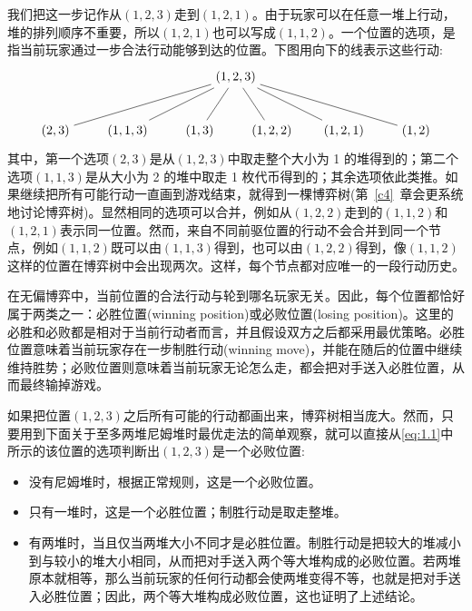 我们把这一步记作从$(1,2,3)$走到$(1,2,1)$。由于玩家可以在任意一堆上行动，堆的排列顺序不重要，所以$(1,2,1)$也可以写成$(1,1,2)$。一个位置的选项，是指当前玩家通过一步合法行动能够到达的位置。下图用向下的线表示这些行动:
\begin{equation}
\begin{tikzpicture}[level distance=1.5cm,
  level 1/.style={sibling distance=2cm},
  baseline=(current bounding box.center)]
  \node {$(1,2,3)$}
    child {node {$(2,3)$}}
    child {node {$(1,1,3)$}}
    child {node {$(1,3)$}}
    child {node {$(1,2,2)$}}
    child {node {$(1,2,1)$}}
    child {node {$(1,2)$}};
\end{tikzpicture}
\label{eq:1.1}
\end{equation}
 其中，第一个选项$(2,3)$是从$(1,2,3)$中取走整个大小为 1 的堆得到的；第二个选项$(1,1,3)$是从大小为 2 的堆中取走 1 枚代币得到的；其余选项依此类推。如果继续把所有可能行动一直画到游戏结束，就得到一棵博弈树(第~\ref{c4}~章会更系统地讨论博弈树)。显然相同的选项可以合并，例如从$(1,2,2)$走到的$(1,1,2)$和$(1,2,1)$表示同一位置。然而，来自不同前驱位置的行动不会合并到同一个节点，例如$(1,1,2)$既可以由$(1,1,3)$得到，也可以由$(1,2,2)$得到，像$(1,1,2)$这样的位置在博弈树中会出现两次。这样，每个节点都对应唯一的一段行动历史。

在无偏博弈中，当前位置的合法行动与轮到哪名玩家无关。因此，每个位置都恰好属于两类之一：必胜位置(winning position)或必败位置(losing position)。这里的必胜和必败都是相对于当前行动者而言，并且假设双方之后都采用最优策略。必胜位置意味着当前玩家存在一步制胜行动(winning move)，并能在随后的位置中继续维持胜势；必败位置则意味着当前玩家无论怎么走，都会把对手送入必胜位置，从而最终输掉游戏。

如果把位置$(1,2,3)$之后所有可能的行动都画出来，博弈树相当庞大。然而，只要用到下面关于至多两堆尼姆堆时最优走法的简单观察，就可以直接从\eqref{eq:1.1}中所示的该位置的选项判断出$(1,2,3)$是一个必败位置:
\begin{itemize}
\item 没有尼姆堆时，根据正常规则，这是一个必败位置。
\item 只有一堆时，这是一个必胜位置；制胜行动是取走整堆。
\item 有两堆时，当且仅当两堆大小不同才是必胜位置。制胜行动是把较大的堆减小到与较小的堆大小相同，从而把对手送入两个等大堆构成的必败位置。若两堆原本就相等，那么当前玩家的任何行动都会使两堆变得不等，也就是把对手送入必胜位置；因此，两个等大堆构成必败位置，这也证明了上述结论。
\end{itemize}

